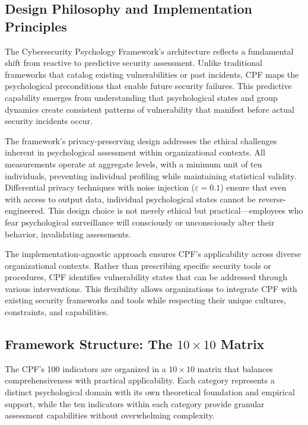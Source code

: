 \documentclass[manuscript,screen,review]{acmart}
\begin{document}
\subsection{Design Philosophy and Implementation Principles}

The Cybersecurity Psychology Framework's architecture reflects a fundamental shift from reactive to predictive security assessment. Unlike traditional frameworks that catalog existing vulnerabilities or past incidents, CPF maps the psychological preconditions that enable future security failures. This predictive capability emerges from understanding that psychological states and group dynamics create consistent patterns of vulnerability that manifest before actual security incidents occur.

The framework's privacy-preserving design addresses the ethical challenges inherent in psychological assessment within organizational contexts. All measurements operate at aggregate levels, with a minimum unit of ten individuals, preventing individual profiling while maintaining statistical validity. Differential privacy techniques with noise injection ($\varepsilon = 0.1$) ensure that even with access to output data, individual psychological states cannot be reverse-engineered. This design choice is not merely ethical but practical—employees who fear psychological surveillance will consciously or unconsciously alter their behavior, invalidating assessments.

The implementation-agnostic approach ensures CPF's applicability across diverse organizational contexts. Rather than prescribing specific security tools or procedures, CPF identifies vulnerability states that can be addressed through various interventions. This flexibility allows organizations to integrate CPF with existing security frameworks and tools while respecting their unique cultures, constraints, and capabilities.

\subsection{Framework Structure: The $10\times10$ Matrix}

The CPF's 100 indicators are organized in a $10\times10$ matrix that balances comprehensiveness with practical applicability. Each category represents a distinct psychological domain with its own theoretical foundation and empirical support, while the ten indicators within each category provide granular assessment capabilities without overwhelming complexity.
\end{document}
